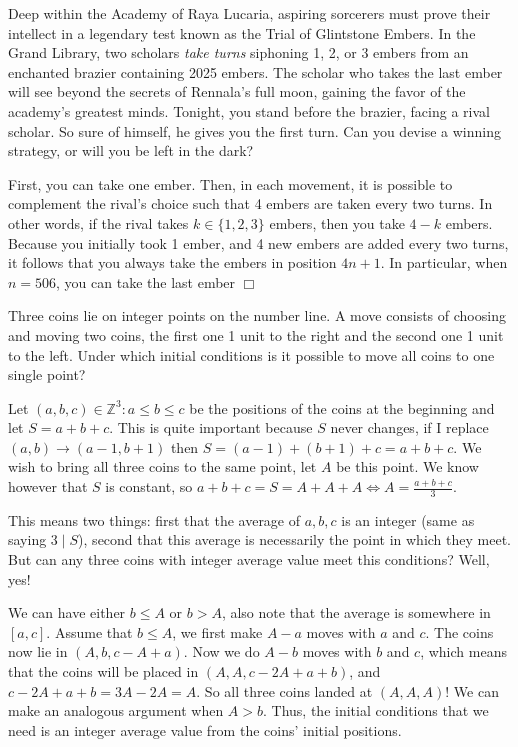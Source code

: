 \begin{problem}
    Deep within the Academy of Raya Lucaria, aspiring sorcerers must prove their intellect in a legendary test known as the Trial of Glintstone Embers. In the Grand Library, two scholars \emph{take turns} siphoning 1, 2, or 3 embers from an enchanted brazier containing 2025 embers. The scholar who takes the last ember will see beyond the secrets of Rennala’s full moon, gaining the favor of the academy’s greatest minds. Tonight, you stand before the brazier, facing a rival scholar. So sure of himself, he gives you the first turn. Can you devise a winning strategy, or will you be left in the dark?
\end{problem}

\begin{solution}
    First, you can take one ember. Then, in each movement, it is possible to complement the rival's choice such that 4 embers are taken every two turns. In other words, if the rival takes $k \in \{1,2,3\}$ embers, then you take $4-k$ embers. Because you initially took 1 ember, and 4 new embers are added every two turns, it follows that you always take the embers in position $4n+1$. In particular, when $n=506$, you can take the last ember $\Box$ 
\end{solution}

\begin{problem}
    Three coins lie on integer points on the number line. A move consists of choosing and moving two coins, the first one 1 unit to the right and the second one 1 unit to the left. Under which initial conditions is it possible to move all coins to one single point?
\end{problem}

\begin{solution}
    Let $(a,b,c) \in \mathbb{Z}^3 : a \leq b \leq c$ be the positions of the coins at the beginning and let $S = a+b+c$. This is quite important because $S$ never changes, if I replace $(a,b) \rightarrow (a-1, b+1)$ then $S = (a-1)+(b+1)+c = a+b+c$. We wish to bring all three coins to the same point, let $A$ be this point. We know however that $S$ is constant, so $a+b+c = S = A+A+A \iff A = \frac{a+b+c}{3}$. 

    This means two things: first that the average of $a,b,c$ is an integer (same as saying $3 \mid S$), second that this average is necessarily the point in which they meet. But can any three coins with integer average value meet this conditions? Well, yes!

    We can have either $b \leq A$ or $b > A$, also note that the average is somewhere in $[a,c]$. Assume that $b \leq A$, we first make $A-a$ moves with $a$ and $c$. The coins now lie in $(A, b, c - A + a)$. Now we do $A-b$ moves with $b$ and $c$, which means that the coins will be placed in $(A, A, c - 2A + a + b)$, and $c-2A+a+b = 3A - 2A = A$. So all three coins landed at $(A,A,A)$! We can make an analogous argument when $A > b$. Thus, the initial conditions that we need is an integer average value from the coins' initial positions.   
\end{solution}

